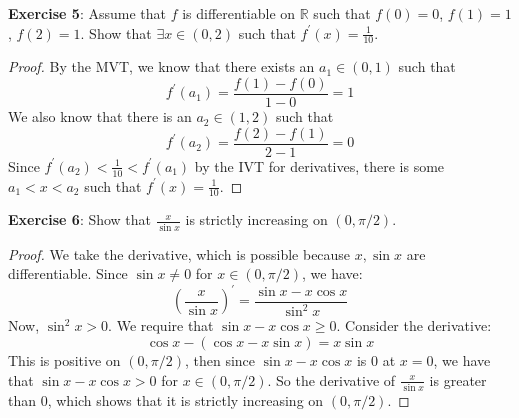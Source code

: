 \documentclass{article}
\begin{document}
\textbf{Exercise 5}: Assume that $f$ is differentiable on $\mathbb{R}$ such that $f(0) = 0$, $f(1) = 1$, $f(2) = 1$. Show that $\exists x \in (0, 2)$ such that $f^{\prime}(x) = \frac{1}{10}$. 
    \begin{proof}
        By the MVT, we know that there exists an $a_{1} \in ( 0, 1)$ such that 
            \begin{equation*}
                f^{\prime}(a_{1}) = \dfrac{f(1) - f(0)}{1 - 0} = 1
            \end{equation*}
        We also know that there is an $a_{2} \in ( 1, 2)$ such that 
            \begin{equation*}
                f^{\prime}(a_{2}) = \dfrac{f(2) - f(1)}{2 - 1} = 0
            \end{equation*}
        Since $f^{\prime}(a_{2}) < \frac{1}{10} < f^{\prime}(a_{1})$ by the IVT for derivatives, there is some $a_{1} < x <  a_{ 2}$ such that $f^{\prime}(x) = \frac{1}{10}$.
    \end{proof}

\textbf{Exercise 6}: Show that $\frac{x}{\sin{x}}$ is strictly increasing on $(0, \pi/2)$.
    \begin{proof}
        We take the derivative, which is possible because $x, \sin{x}$ are differentiable. Since $\sin{x} \neq 0$ for $x \in ( 0, \pi/2)$, we have:
            \begin{equation*}
                \left(\dfrac{x}{\sin{x}}\right)^{\prime} = \dfrac{\sin{x} - x\cos{x}}{\sin^{2}{x}}
            \end{equation*}
        Now, $\sin^{2}{x} > 0$. We require that $\sin{x} - x\cos{x} \geq 0$. Consider the derivative:
            \begin{equation*}
                \cos{x} - (\cos{x} -x\sin{x}) = x\sin{x}
            \end{equation*}
        This is positive on $(0, \pi/2)$, then since $\sin{x} - x\cos{x}$ is $0$ at $x = 0$, we have that $\sin{x} - x\cos{x} > 0$ for $x \in  ( 0, \pi/2)$. So the derivative of $\frac{x}{\sin{x}}$ is greater than $0$, which shows that it is strictly increasing on $(0, \pi/2)$.
    \end{proof}
\end{document}
